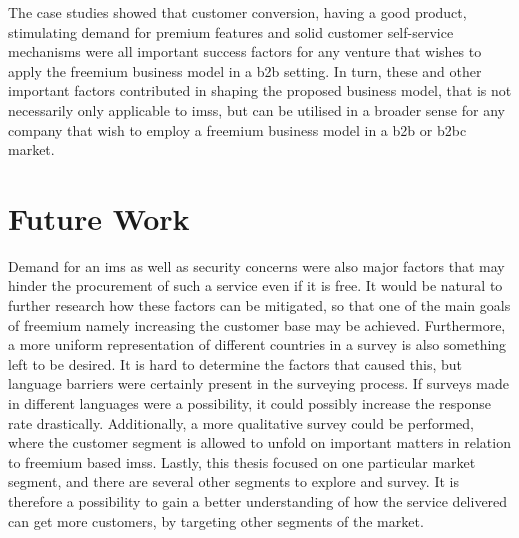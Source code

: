 The case studies showed that customer conversion, having a good product, stimulating demand for premium features and solid customer self-service mechanisms were all important success factors for any venture that wishes to apply the freemium business model in a \gls{b2b} setting. In turn, these and other important factors contributed in shaping the proposed business model, that is not necessarily only applicable to \glspl{ims}, but can be utilised in a broader sense for any company that wish to employ a freemium business model in a \gls{b2b} or \gls{b2bc} market. 


\section{Future Work}
Demand for an \gls{ims} as well as security concerns were also major factors that may hinder the procurement of such a service even if it is free. It would be natural to further research how these factors can be mitigated, so that one of the main goals of freemium namely increasing the customer base may be achieved. Furthermore, a more uniform representation of different countries in a survey is also something left to be desired. It is hard to determine the factors that caused this, but language barriers were certainly present in the surveying process. If surveys made in different languages were a possibility, it could possibly increase the response rate drastically. Additionally, a more qualitative survey could be performed, where the customer segment is allowed to unfold on important matters in relation to freemium based \glspl{ims}. Lastly, this thesis focused on one particular market segment, and there are several other segments to explore and survey. It is therefore a possibility to gain a better understanding of how the service delivered can get more customers, by targeting other segments of the market. 